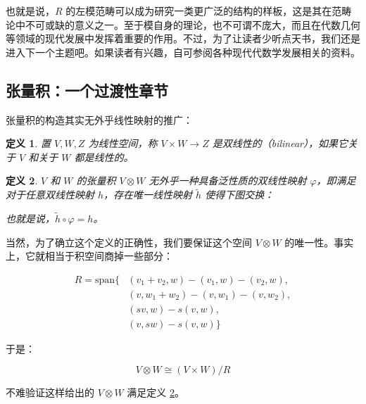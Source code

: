 \documentclass{ctexbook}
\newtheorem{definition}{定义}[chapter] %
\begin{document}
也就是说，$R$ 的左模范畴可以成为研究一类更广泛的结构的样板，这是其在范畴论中不可或缺的意义之一。至于模自身的理论，也不可谓不庞大，而且在代数几何等领域的现代发展中发挥着重要的作用。不过，为了让读者少听点天书，我们还是进入下一个主题吧。如果读者有兴趣，自可参阅各种现代代数学发展相关的资料。

\subsection{张量积：一个过渡性章节}

张量积的构造其实无外乎线性映射的推广：

\begin{definition}
    置 $V, W, Z$ 为线性空间，称 $V \times W \to Z$ 是双线性的（bilinear），如果它关于 $V$ 和关于 $W$ 都是线性的。
\end{definition}

\begin{definition} \label{tensorprod}
    $V$ 和 $W$ 的张量积 $V \otimes W$ 无外乎一种具备泛性质的双线性映射 $\varphi$，即满足对于任意双线性映射 $h$，存在唯一线性映射 $\tilde h$ 使得下图交换：
    
    \begin{center}
    \end{center}

    也就是说，$\tilde h \circ \varphi = h$。
\end{definition}

当然，为了确立这个定义的正确性，我们要保证这个空间 $V \otimes W$ 的唯一性。事实上，它就相当于积空间商掉一些部分：

\begin{align*}
    R = \mathrm{span}\{&(v_1 + v_2, w) - (v_1, w) - (v_2, w), \\
    & (v, w_1 + w_2) - (v, w_1) - (v, w_2), \\
    & (sv, w) - s(v, w), \\
    & (v, sw) - s(v, w)\}
\end{align*}

于是：

\[
V \otimes W \cong (V \times W) / R
\]

不难验证这样给出的 $V \otimes W$ 满足定义 \ref{tensorprod}。
\end{document}
